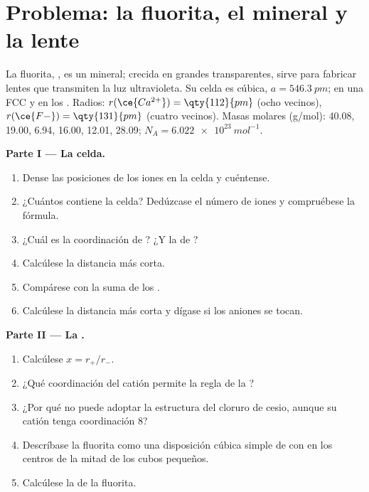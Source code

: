 \section{Problema: la fluorita, el mineral y la lente}

\begin{problem}
\label{pb:b1:crystals-ionic-covalent:1}
La fluorita, , es un mineral; crecida en grandes 
transparentes, sirve para fabricar lentes que transmiten la luz
ultravioleta. Su celda es cúbica, $a =
\qty{546.3}{pm}$;  en una  FCC y  en los . Radios: $r(\ce{Ca^{2+}}) = \qty{112}{pm}$ (ocho vecinos),
$r(\ce{F-}) = \qty{131}{pm}$ (cuatro vecinos). Masas molares (g/mol):
 40.08,  19.00,  6.94,  16.00, 
12.01,  28.09; $N_A = \qty{6.022e23}{mol^{-1}}$.

\medskip
\noindent\textbf{Parte I --- La celda.}
\begin{enumerate}
  \item Dense las posiciones de los iones  en la celda y
        cuéntense.
  \item ¿Cuántos  contiene la celda? Dedúzcase el
        número de iones  y compruébese la fórmula.
  \item ¿Cuál es la coordinación de ? ¿Y la de ?
  \item Calcúlese la distancia  más corta.
  \item Compárese con la suma de los .
  \item Calcúlese la distancia  más corta y dígase si los aniones
        se tocan.
\end{enumerate}

\medskip
\noindent\textbf{Parte II --- La .}
\begin{enumerate}[resume]
  \item Calcúlese $x = r_+/r_-$.
  \item ¿Qué coordinación del catión permite la regla de la ?
  \item ¿Por qué  no puede adoptar la estructura del cloruro de
        cesio, aunque su catión tenga coordinación 8?
  \item Descríbase la fluorita como una disposición cúbica simple de
         con  en los centros de la mitad de los cubos
        pequeños.
  \item Calcúlese la  de la fluorita.
\end{enumerate}


\end{problem}
